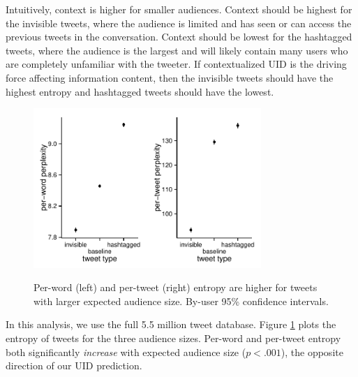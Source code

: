 \documentclass[11pt,letterpaper]{article}
\begin{document}
Intuitively, context is higher for smaller audiences. Context should be highest for the invisible tweets, where the audience is limited and has seen or can access the previous tweets in the conversation.  Context should be lowest for the hashtagged tweets, where the audience is the largest and will likely contain many users who are completely unfamiliar with the tweeter.  If contextualized UID is the driving force affecting information content, then the invisible tweets should have the highest entropy and hashtagged tweets should have the lowest.

\begin{figure}
 \centering \includegraphics[width=1.7in]{figures/cmcl-audience-pw.pdf}\includegraphics[width=1.7in]{figures/cmcl-audience-pt.pdf}
 \caption{\label{fig:audience} Per-word (left) and per-tweet (right) entropy are higher for tweets with larger expected audience size. By-user 95\% confidence intervals.}
\vspace*{-.5em}
\end{figure}

In this analysis, we use the full 5.5 million tweet database. Figure \ref{fig:audience} plots the entropy of tweets for the three audience sizes.  Per-word and per-tweet entropy both significantly {\it increase} with expected audience size ($p < .001$), the opposite direction of our UID prediction. 
\end{document}
